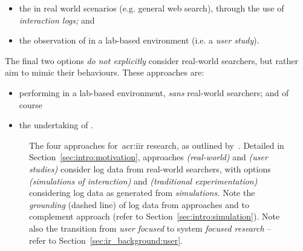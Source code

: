 \begin{itemize}
    \item[]{ the  in real world scenarios (e.g. general web search), through the use of \emph{interaction logs;} and}
    \item[]{ the observation of  in a lab-based environment (i.e. a \emph{user study}).}
\end{itemize}

The final two options \emph{do not explicitly} consider real-world searchers, but rather aim to mimic their behaviours. These approaches are:

\begin{itemize}
    \item[]{ performing  in a lab-based environment, \emph{sans} real-world searchers; and of course}
    \item[]{ the undertaking of .}
\end{itemize}

\begin{figure}[t!]
    \centering
    \caption[Approaches to~\gls{acr:iir} research]{The four approaches for~\gls{acr:iir} research, as outlined by~\cite{keskustalo2008user_simulation}. Detailed in Section~\ref{sec:intro:motivation}, approaches  \emph{(real-world)} and  \emph{(user studies)} consider log data from real-world searchers, with options  \emph{(simulations of interaction)} and  \emph{(traditional experimentation)} considering log data as generated from \emph{simulations.} Note the \emph{grounding} (dashed line) of log data from approaches  and  to complement approach  (refer to Section~\ref{sec:intro:simulation}). Note also the transition from \emph{user focused} to system \emph{focused research} – refer to Section~\ref{sec:ir_background:user}.}
    \label{fig:ch1-options}
\end{figure}

